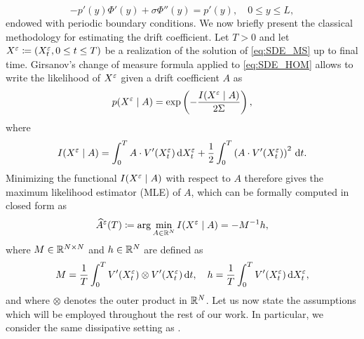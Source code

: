 \documentclass[review,onefignum,onetabnum]{siamonline190516}
\begin{document}
\begin{equation}\label{eq:CellProblem}
	-p'(y)\Phi'(y) + \sigma \Phi''(y) = p'(y), \quad 0 \leq y \leq L,
\end{equation}
endowed with periodic boundary conditions. 
We now briefly present the classical methodology for estimating the drift coefficient. Let $T > 0$ and let $X^\varepsilon \coloneqq (X^\varepsilon_t, 0\leq t \leq T)$ be a realization of the solution of \eqref{eq:SDE_MS} up to final time. Girsanov's change of measure formula applied to \eqref{eq:SDE_HOM} allows to write the likelihood of $X^\varepsilon$ given a drift coefficient $A$ as
\begin{equation}\label{eq:Likelihood}
p(X^\epl \mid A) = \exp\left(-\frac{I(X^\epl\mid A)}{2\Sigma} \right), 
\end{equation}
where 
\begin{equation}
I(X^\varepsilon \mid A) = \int_0^T A \cdot V'(X^\varepsilon_t) \,\mathrm{d} X^\varepsilon_t + \frac12 \int_0^T \left( A \cdot V'(X^\varepsilon_t) \right)^2 \,\mathrm{d} t.
\end{equation}
Minimizing the functional $I(X^\varepsilon \mid A)$ with respect to $A$ therefore gives the maximum likelihood estimator (MLE) of $A$, which can be formally computed in closed form as
\begin{equation}\label{eq:MLE}
	\widehat A^\epl(T) \defeq \arg \min_{A \in \R^N} I(X^\epl \mid A) = - M^{-1}h,
\end{equation}
where $M\in\mathbb{R}^{N\times N}$ and $h\in\mathbb{R}^N$ are defined as
\begin{equation}\label{eq:MandH}
M = \frac1T \int_0^T V'(X^\epl_t) \otimes V'(X^\epl_t) \dd t, \quad h = \frac1T \int_0^T V'(X^\epl_t) \dd X^\epl_t,
\end{equation}
and where $\otimes$ denotes the outer product in $\mathbb{R}^N$. Let us now state the assumptions which will be employed throughout the rest of our work. In particular, we consider the same dissipative setting as \cite[Assumption 3.1]{PaS07}.
\end{document}
